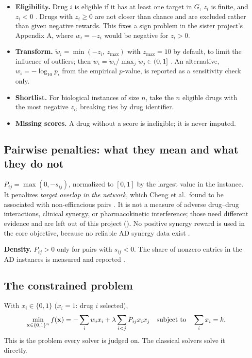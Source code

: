 \begin{itemize}
\item \textbf{Eligibility.} Drug $i$ is eligible if it has at least one target in $G$, $z_i$ is finite, and $z_i<0$ \proposed. Drugs with $z_i\ge 0$ are not closer than chance and are excluded rather than given negative rewards. This fixes a sign problem in the sister project's Appendix A, where $w_i=-z_i$ would be negative for $z_i>0$.
\item \textbf{Transform.} $\tilde w_i=\min(-z_i,\,z_{\max})$ with $z_{\max}=10$ by default, to limit the influence of outliers; then $w_i=\tilde w_i/\max_j\tilde w_j\in(0,1]$ \proposed. An alternative, $w_i=-\log_{10}p_i$ from the empirical $p$-value, is reported as a sensitivity check only.
\item \textbf{Shortlist.} For biological instances of size $n$, take the $n$ eligible drugs with the most negative $z_i$, breaking ties by drug identifier.
\item \textbf{Missing scores.} A drug without a score is ineligible; it is never imputed.
\end{itemize}

\subsection{Pairwise penalties: what they mean and what they do not}

$P_{ij}=\max(0,-s_{ij})$, normalized to $[0,1]$ by the largest value in the instance. It penalizes \emph{target overlap in the network}, which Cheng et al.\ found to be associated with non-efficacious pairs \cite{cheng2019combinations}. It is not a measure of adverse drug--drug interactions, clinical synergy, or pharmacokinetic interference; those need different evidence and are left out of this project (). No positive synergy reward is used in the core objective, because no reliable AD synergy data exist \proposed.

\textbf{Density.} $P_{ij}>0$ only for pairs with $s_{ij}<0$. The share of nonzero entries in the AD instances is measured and reported .

\subsection{The constrained problem}

With $x_i\in\{0,1\}$ ($x_i=1$: drug $i$ selected),
\begin{equation}
\min_{\mathbf{x}\in\{0,1\}^n} f(\mathbf{x})=-\sum_{i}w_ix_i+\lambda\sum_{i<j}P_{ij}x_ix_j \quad\text{subject to}\quad \sum_i x_i=k.
\label{eq:constrained}
\end{equation}
This is the problem every solver is judged on. The classical solvers solve it directly.

